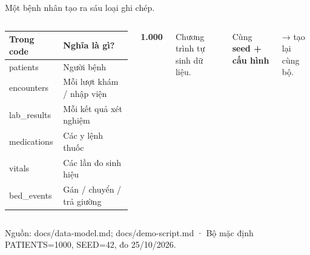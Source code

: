 \documentclass[aspectratio=169,11pt]{beamer}
\renewcommand{\small}{\fontsize{18}{24}\selectfont}
\renewcommand{\footnotesize}{\fontsize{13}{17}\selectfont}
\newcommand{\source}[1]{\vfill{\footnotesize\color{muted}Nguồn: #1\par}}
\newcommand{\bigstat}[2]{{\fontsize{56}{60}\selectfont\bfseries\color{teal}#1}\par\vspace{2mm}{\small #2}}
\begin{document}
\begin{frame}{Một bệnh nhân tạo ra sáu loại ghi chép.}
  \begin{columns}[T,onlytextwidth]
      {\fontsize{20}{25}\selectfont
      \renewcommand{\arraystretch}{1.3}
      \begin{tabular}{@{}ll@{}}
        \toprule
        \textbf{Trong code} & \textbf{Nghĩa là gì?}\\\midrule
        patients & Người bệnh\\
        encounters & Mỗi lượt khám / nhập viện\\
        lab\_results & Mỗi kết quả xét nghiệm\\
        medications & Các y lệnh thuốc\\
        vitals & Các lần đo sinh hiệu\\
        bed\_events & Gán / chuyển / trả giường\\\bottomrule
      \end{tabular}}
      \bigstat{1.000}{bệnh nhân giả lập}\par\vspace{8mm}
      {\small Chương trình tự sinh dữ liệu.\par Cùng \textbf{seed + cấu hình}\par → tạo lại cùng bộ.}
  \end{columns}
  \source{docs/data-model.md; docs/demo-script.md · Bộ mặc định PATIENTS=1000, SEED=42, đo 25/10/2026.}
\end{frame}
\end{document}
